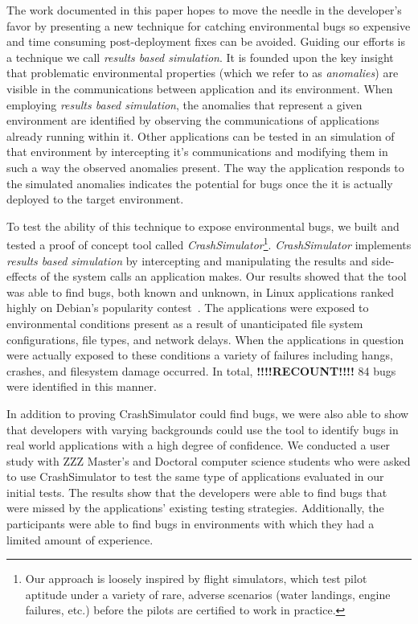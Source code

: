 The work documented in this paper
hopes to move the needle in the developer's favor
by presenting a new technique for catching environmental bugs
so expensive and time consuming post-deployment fixes can be avoided.
Guiding our efforts
is a technique
we call \textit{results based simulation}.
It is founded upon the key insight
that problematic environmental properties
(which we refer to as \textit{anomalies})
are visible in the communications
between application and its environment.
When employing \textit{results based simulation},
the anomalies that represent a given environment
are identified by
observing the communications of applications already running within it.
Other applications can be tested in an simulation of that environment
by intercepting it's communications
and modifying them in such a way
the observed anomalies present.
The way the application responds to the simulated anomalies
indicates the potential for bugs once the it is actually deployed
to the target environment.

To test the ability of this technique to expose environmental
bugs, we built and tested a proof of concept tool
called {\em CrashSimulator}\footnote{Our approach is
loosely inspired by flight simulators, which test pilot aptitude under a
variety of rare, adverse scenarios (water landings, engine failures, etc.)
before the pilots are certified to work in practice.}.
{\em CrashSimulator} implements \textit{results based simulation}
by intercepting and manipulating the results and side-effects
of the system calls an application makes.
Our results showed that the tool was able to find bugs,
both known and unknown,
in Linux applications ranked highly on Debian's popularity
contest~\cite{DebPopCon}.  The applications were exposed to
environmental conditions present as a result of unanticipated
file system configurations, file types, and network delays.
When the applications in
question were actually exposed to these conditions a variety of failures
including hangs, crashes, and filesystem damage occurred.  In total,
\textbf{!!!!RECOUNT!!!!} 84
bugs were identified in this manner.

In addition to proving CrashSimulator could find bugs, we were also able to
show that developers with varying backgrounds
could use the tool to identify bugs
in real world applications
with a high degree of confidence.
We conducted a user study with
ZZZ Master's and Doctoral computer science students
who were asked to use CrashSimulator to test
the same type of applications evaluated in our initial tests.
The results show that the developers were able to find bugs
that were missed by the applications' existing testing strategies.
Additionally, the
participants were able to find bugs
in environments with which they had a limited amount of experience.

